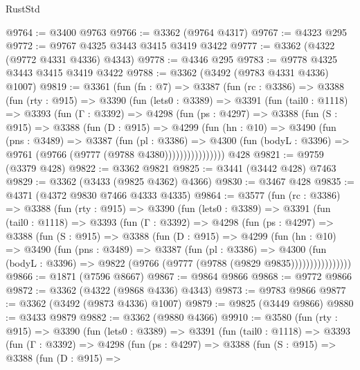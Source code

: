 \begin{lexlean}{RustStd}
\begin{coremodule}
@9764 := @3400 @9763
@9766 := @3362 (@9764 @4317)
@9767 := @4323 @295
@9772 := @9767 @4325 @3443 @3415 @3419 @3422
@9777 := @3362 (@4322 (@9772 @4331 @4336) @4343)
@9778 := @4346 @295
@9783 := @9778 @4325 @3443 @3415 @3419 @3422
@9788 := @3362 (@3492 (@9783 @4331 @4336) @1007)
@9819 := @3361
    (fun (fn : @7) =>
    @3387
      (fun (rc : @3386) =>
      @3388
        (fun (rty : @915) =>
        @3390
          (fun (lets0 : @3389) =>
          @3391
            (fun (tail0 : @1118) =>
            @3393
              (fun (Γ : @3392) =>
              @4298
                (fun (ps : @4297) =>
                @3388
                  (fun (S : @915) =>
                  @3388
                    (fun (D : @915) =>
                    @4299
                      (fun (hn : @10) =>
                      @3490
                        (fun (pns : @3489) =>
                        @3387
                          (fun (pl : @3386) =>
                          @4300
                            (fun (bodyL : @3396) => @9761 (@9766 (@9777 (@9788 @4380))))))))))))))))
    @428
@9821 := @9759 (@3379 @428)
@9822 := @3362 @9821
@9825 := @3441 (@3442 @428) @7463
@9829 := @3362 (@3433 (@9825 @4362) @4366)
@9830 := @3467 @428
@9835 := @4371 (@4372 @9830 @7466 @4333 @4335)
@9864 := @3577
    (fun (rc : @3386) =>
    @3388
      (fun (rty : @915) =>
      @3390
        (fun (lets0 : @3389) =>
        @3391
          (fun (tail0 : @1118) =>
          @3393
            (fun (Γ : @3392) =>
            @4298
              (fun (ps : @4297) =>
              @3388
                (fun (S : @915) =>
                @3388
                  (fun (D : @915) =>
                  @4299
                    (fun (hn : @10) =>
                    @3490
                      (fun (pns : @3489) =>
                      @3387
                        (fun (pl : @3386) =>
                        @4300
                          (fun (bodyL : @3396) =>
                          @9822 (@9766 (@9777 (@9788 (@9829 @9835))))))))))))))))
@9866 := @1871 (@7596 @8667)
@9867 := @9864 @9866
@9868 := @9772 @9866
@9872 := @3362 (@4322 (@9868 @4336) @4343)
@9873 := @9783 @9866
@9877 := @3362 (@3492 (@9873 @4336) @1007)
@9879 := @9825 (@3449 @9866)
@9880 := @3433 @9879
@9882 := @3362 (@9880 @4366)
@9910 := @3580
    (fun (rty : @915) =>
    @3390
      (fun (lets0 : @3389) =>
      @3391
        (fun (tail0 : @1118) =>
        @3393
          (fun (Γ : @3392) =>
          @4298
            (fun (ps : @4297) =>
            @3388
              (fun (S : @915) =>
              @3388
                (fun (D : @915) =>

\end{coremodule}
\end{lexlean}
